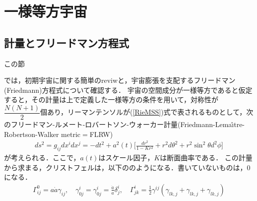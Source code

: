 \section{一様等方宇宙}
\subsection{計量とフリードマン方程式}
\hypertarget{ApA}{この節}では，初期宇宙に関する簡単のreviwと，宇宙膨張を支配するフリードマン(Friedmann)方程式について確認する．
宇宙の空間成分が一様等方であると仮定すると，その計量は上で定義した一様等方の条件を用いて，対称性が$\dfrac{N(N+1)}{2}$個あり，リーマンテンソルが(\ref{RieMSS})式で表されるものとして，次のフリードマン-ルメート-ロバートソン-ウォーカー計量(Friedmann-Lema\^{\i}tre-Robertson-Walker metric$=$FLRW)
\begin{eqnarray}
\label{FL}
ds^2=g_{ij}dx^idx^j=-dt^2+a^2(t)\biggl[\frac{dr^2}{1-Kr^2}+r^2d\theta^2+r^2\sin^2\theta d^2\phi\biggr]
\end{eqnarray}
が考えられる．ここで，$a(t)$はスケール因子，$K$は断面曲率である．
この計量から求まる，クリストフェルは，以下ののようになる．書いていないものは，$0$になる．
\begin{eqnarray}
\label{cccch}
\Gamma^{0}_{ij}=a\dot{a}\gamma_{ij},\quad \gamma^{i}_{0j}=\gamma^{i}_{0j}=\frac{\dot{a}}{a}\delta^{i}_{j},\quad \Gamma^{i}_{jk}=\frac{1}{2}\gamma^{ij}(\gamma_{lk,j}+\gamma_{lk,j}+\gamma_{lk,j})
\end{eqnarray}


